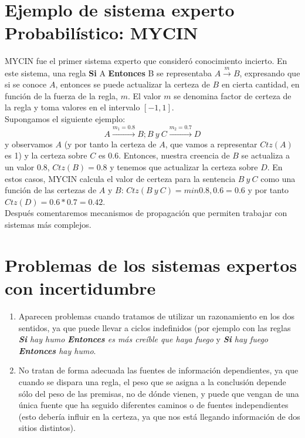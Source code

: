 \documentclass{article}
\theoremstyle{definition_wo_parentheses}
\begin{document}
\section{Ejemplo de sistema experto Probabilístico: MYCIN}
MYCIN fue el primer sistema experto que consideró conocimiento incierto. En este sistema, una regla \textbf{Si} A \textbf{Entonces} B se representaba $A \overset{m}{\rightarrow}B$, expresando que si se conoce $A$, entonces se puede actualizar la certeza de $B$ en cierta cantidad, en función de la fuerza de la regla, $m$. El valor $m$ se denomina factor de certeza de la regla y toma valores en el intervalo $[-1,1]$.\\

Supongamos el siguiente ejemplo:
\[A \overset{m_1=0.8}{\longrightarrow} B ; B\ y\ C \overset{m_2=0.7}{\longrightarrow} D
\]
y observamos $A$ (y por tanto la certeza de $A$, que vamos a representar $Ctz(A)$ es 1) y la certeza sobre $C$ es 0.6. Entonces, nuestra creencia de $B$ se actualiza a un valor 0.8, $Ctz(B)=0.8$ y tenemos que actualizar la certeza sobre $D$. En estos casos, MYCIN calcula el valor de certeza para la sentencia $B\ y \ C$ como una función de las certezas de $A$ y $B$: $Ctz(B\ y\ C) = min{0.8,0.6}=0.6$ y por tanto $Ctz(D)=0.6*0.7=0.42$.\\

Después comentaremos mecanismos de propagación que permiten trabajar con sistemas más complejos.

\section{Problemas de los sistemas expertos con incertidumbre}
\begin{enumerate}
    \item Aparecen problemas cuando tratamos de utilizar un razonamiento en los dos sentidos, ya que puede llevar a ciclos indefinidos (por ejemplo con las reglas \textit{\textbf{Si} hay humo \textbf{Entonces} es más creíble que haya fuego} y \textit{\textbf{Si} hay fuego \textbf{Entonces} hay humo}.
    \item No tratan de forma adecuada las fuentes de información dependientes, ya que cuando se dispara una regla, el peso que se asigna a la conclusión depende sólo del peso de las premisas, no de dónde vienen, y puede que vengan de una única fuente que ha seguido diferentes caminos o de fuentes independientes (esto debería influir en la certeza, ya que nos está llegando información de dos sitios distintos).
\end{enumerate}
\end{document}
